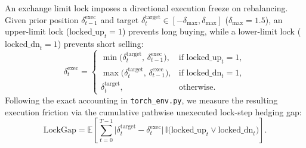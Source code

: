 \documentclass[11pt,a4paper]{article}
\begin{document}
An exchange limit lock imposes a directional execution freeze on rebalancing. Given prior position $\delta_{t-1}^{\text{exec}}$ and target $\delta_t^{\text{target}} \in [-\delta_{\max}, \delta_{\max}]$ ($\delta_{\max} = 1.5$), an upper-limit lock ($\text{locked\_up}_t = 1$) prevents long buying, while a lower-limit lock ($\text{locked\_dn}_t = 1$) prevents short selling:
\begin{equation}
  \delta_t^{\text{exec}} = \begin{cases}
  \min\big(\delta_t^{\text{target}},\, \delta_{t-1}^{\text{exec}}\big), & \text{if } \text{locked\_up}_t = 1, \\
  \max\big(\delta_t^{\text{target}},\, \delta_{t-1}^{\text{exec}}\big), & \text{if } \text{locked\_dn}_t = 1, \\
  \delta_t^{\text{target}}, & \text{otherwise.}
  \end{cases}
  \label{eq:exec_freeze}
\end{equation}
Following the exact accounting in \texttt{torch\_env.py}, we measure the resulting execution friction via the cumulative pathwise unexecuted lock-step hedging gap:
\begin{equation}
  \text{LockGap} = \mathbb{E}\left[\sum_{t=0}^{T-1}\big|\delta_t^{\text{target}} - \delta_t^{\text{exec}}\big|\,\mathbb{I}\big(\text{locked\_up}_t \lor \text{locked\_dn}_t\big)\right].
  \label{eq:lock_gap}
\end{equation}
\end{document}

